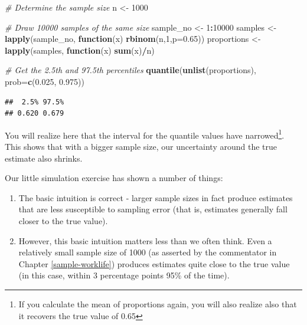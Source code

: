 \documentclass[
  openany]{book}
\newenvironment{Shaded}{\begin{snugshade}}{\end{snugshade}}
\newcommand{\CommentTok}[1]{\textcolor[rgb]{0.56,0.35,0.01}{\textit{#1}}}
\newcommand{\ControlFlowTok}[1]{\textcolor[rgb]{0.13,0.29,0.53}{\textbf{#1}}}
\newcommand{\DataTypeTok}[1]{\textcolor[rgb]{0.13,0.29,0.53}{#1}}
\newcommand{\DecValTok}[1]{\textcolor[rgb]{0.00,0.00,0.81}{#1}}
\newcommand{\FloatTok}[1]{\textcolor[rgb]{0.00,0.00,0.81}{#1}}
\newcommand{\KeywordTok}[1]{\textcolor[rgb]{0.13,0.29,0.53}{\textbf{#1}}}
\newcommand{\NormalTok}[1]{#1}
\newcommand{\OperatorTok}[1]{\textcolor[rgb]{0.81,0.36,0.00}{\textbf{#1}}}
\newcommand{\StringTok}[1]{\textcolor[rgb]{0.31,0.60,0.02}{#1}}
\providecommand{\tightlist}{%
  \setlength{\itemsep}{0pt}\setlength{\parskip}{0pt}}
\begin{document}
\begin{Shaded}
\begin{Highlighting}[]
\CommentTok{# Determine the sample size}
\NormalTok{n <-}\StringTok{ }\DecValTok{1000}

\CommentTok{# Draw 10000 samples of the same size}
\NormalTok{sample_no <-}\StringTok{ }\DecValTok{1}\OperatorTok{:}\DecValTok{10000}
\NormalTok{samples <-}\StringTok{ }\KeywordTok{lapply}\NormalTok{(sample_no, }\ControlFlowTok{function}\NormalTok{(x) }\KeywordTok{rbinom}\NormalTok{(n,}\DecValTok{1}\NormalTok{,}\DataTypeTok{p=}\FloatTok{0.65}\NormalTok{))}
\NormalTok{proportions <-}\StringTok{ }\KeywordTok{lapply}\NormalTok{(samples, }\ControlFlowTok{function}\NormalTok{(x) }\KeywordTok{sum}\NormalTok{(x)}\OperatorTok{/}\NormalTok{n)}

\CommentTok{# Get the 2.5th and 97.5th percentiles}
\KeywordTok{quantile}\NormalTok{(}\KeywordTok{unlist}\NormalTok{(proportions), }\DataTypeTok{prob=}\KeywordTok{c}\NormalTok{(}\FloatTok{0.025}\NormalTok{, }\FloatTok{0.975}\NormalTok{))}
\end{Highlighting}
\end{Shaded}

\begin{verbatim}
##  2.5% 97.5% 
## 0.620 0.679
\end{verbatim}

You will realize here that the interval for the quantile values have narrowed\footnote{If you calculate the mean of proportions again, you will also realize also that it recovers the true value of 0.65}. This shows that with a bigger sample size, our uncertainty around the true estimate also shrinks.

Our little simulation exercise has shown a number of things:

\begin{enumerate}
\def\labelenumi{\arabic{enumi}.}
\tightlist
\item
  The basic intuition is correct - larger sample sizes in fact produce estimates that are less susceptible to sampling error (that is, estimates generally fall closer to the true value).
\item
  However, this basic intuition matters less than we often think. Even a relatively small sample size of 1000 (as asserted by the commentator in Chapter \ref{sample-worklife}) produces estimates quite close to the true value (in this case, within 3 percentage points 95\% of the time).
\end{enumerate}
\end{document}
